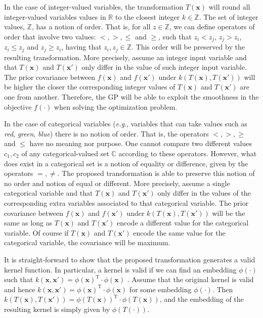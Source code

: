 In the case of integer-valued variables, the transformation $T(\mathbf{x})$ will round all integer-valued 
variables values in $\mathds{R}$ to the closest integer $k \in \mathds{Z}$. The set of integer values, 
$\mathds{Z}$, has a notion of order. That is, for all $z \in \mathbb{Z}$, we can define operators of order 
that involve two values: $<,>,\leq$ and $\geq$, such that $z_i < z_j$, $z_j > z_i$, $z_i \leq z_j$ and 
$z_j \geq z_i$, having that $z_i,z_j \in \mathbb{Z}$. This order will be preserved by the
resulting transformation. More precisely, assume an integer input variable and that $T(\mathbf{x})$ and $T(\mathbf{x}')$ 
only differ in the value of such integer input variable. The prior covariance between 
$f(\mathbf{x})$ and $f(\mathbf{x}')$ under $k(T(\mathbf{x}),T(\mathbf{x}'))$ will be higher the closer the 
corresponding integer values of $T(\mathbf{x})$ and $T(\mathbf{x}')$ are one from another. Therefore, the GP 
will be able to exploit the smoothness in the objective $f(\cdot)$ when solving the optimization problem.

In the case of categorical variables (\emph{e.g.}, variables that can take values such as 
\emph{red}, \emph{green}, \emph{blue}) there is no notion of order. That is, the operators 
$<,>,\geq$ and $\leq$ have no meaning nor purpose. One cannot compare two different 
values $c_1,c_2$ of any categorical-valued set $\mathds{C}$ according to these operators. However, 
what does exist in a categorical set is a notion of equality or difference, given by the operators $=,\neq$. 
The proposed transformation is able to preserve this notion of no order and notion of equal or 
different. More precisely, assume a single categorical variable and that $T(\mathbf{x})$ and $T(\mathbf{x}')$ 
only differ in the values of the corresponding extra variables associated to that categorical variable.
The prior covariance between $f(\mathbf{x})$ and $f(\mathbf{x}')$ under 
$k(T(\mathbf{x}),T(\mathbf{x}'))$ will be the same as long as $T(\mathbf{x})$ and $T(\mathbf{x}')$
encode a different value for the categorical variable. Of course if $T(\mathbf{x})$ and $T(\mathbf{x}')$
encode the same value for the categorical variable, the covariance will be maximum.

It is straight-forward to show that the proposed transformation generates a valid kernel function.
In particular, a kernel is valid if we can find an embedding $\phi(\cdot)$ such that $k(\mathbf{x},\mathbf{x}')=
\phi(\mathbf{x})^\text{T}\cdot \phi(\mathbf{x})$ \citep{shawe2004kernel}. Assume that the original kernel is valid
and hence $k(\mathbf{x},\mathbf{x}')= \phi(\mathbf{x})^\text{T}\cdot \phi(\mathbf{x})$ for some embedding $\phi(\cdot)$.
Then $k(T(\mathbf{x}),T(\mathbf{x}'))= \phi(T(\mathbf{x}))^\text{T}\cdot \phi(T(\mathbf{x}))$, and the  embedding
of the resulting kernel is simply given by $\phi(T(\cdot))$.

